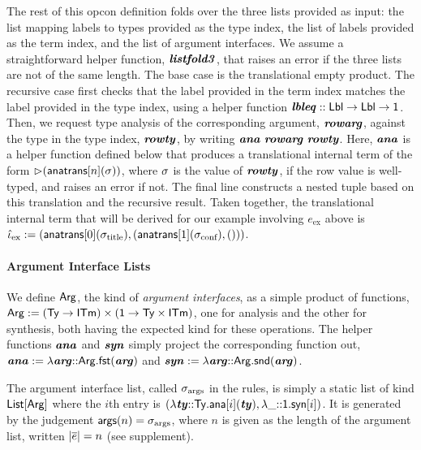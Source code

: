 \documentclass[10pt,preprint]{sigplanconf}
\begin{document}
The rest of this opcon definition folds over the three lists provided as input: the list mapping labels to types provided as the type index, the list of labels provided as the term index, and the list of argument interfaces. We assume a straightforward helper function, ${\textbf{\textit{listfold3}}}$, that raises an error if the three lists are not of the same length. The base case is the translational empty product. The recursive case first checks that the label provided in the term index matches the label provided in the type index, using a helper function ${\textbf{\textit{lbleq}}} :: {\sf Lbl} \rightarrow {\sf Lbl} \rightarrow {\sf 1}$. Then, we request type analysis of the corresponding argument, ${\textbf{\textit{rowarg}}}$,  against the type in the type index, ${\textbf{\textit{rowty}}}$, by writing ${\textbf{\textit{ana}}}~{\textbf{\textit{rowarg}}}~{\textbf{\textit{rowty}}}$. Here, ${\textbf{\textit{ana}}}$ is a helper function defined below that produces a translational internal term  of the form ${\rhd}({\sf anatrans}[n](\sigma))$, where $\sigma$ is the value of ${\textbf{\textit{rowty}}}$, if the row value is well-typed, and raises an error if not. The final line constructs a nested tuple based on this translation and the recursive result. Taken together, the translational internal term that will be derived for our example involving $e_\text{ex}$ above is $\small\qitm_\text{ex} := (\anatrans{0}{\stx{title}}, (\anatrans{1}{\stx{conf}}, ()))$.

\paragraph{Argument Interface Lists} We define ${\sf Arg}$, the kind of \emph{argument interfaces}, as a simple product of functions, ${\sf Arg} := ({\sf Ty} \rightarrow {\sf ITm}) \times ({\sf 1} \rightarrow {\sf Ty}\times{\sf ITm})$, one for analysis and the other for synthesis, both having the expected kind for these operations. The helper functions ${\textbf{\textit{ana}}}$ and ${\textbf{\textit{syn}}}$ simply project the corresponding function out, ${\textbf{\textit{ana}}} := \lambda {\textbf{\textit{arg}}}{::}{\sf Arg}.{\sf fst}({\textbf{\textit{arg}}})$ and ${\textbf{\textit{syn}}}  :=  \lambda {\textbf{\textit{arg}}}{::}{\sf Arg}.{\sf snd}({\textbf{\textit{arg}}})$. 

The argument interface list, called $\sigma_\text{args}$ in the rules, is simply a static list of kind ${\sf List}[{\sf Arg}]$ where the $i$th entry is $(\lambda {\textbf{\textit{ty}}}{::}{\sf Ty}.{\sf ana}[i]({\textbf{\textit{ty}}}), \lambda \_{::}{\sf 1}.{\sf syn}[i])$. It is generated by the judgement ${\sf args}(n)=\sigma_\text{args}$, where $n$ is given as the length of the argument list, written $|\overline{e}|=n$ (see supplement).



\end{document}
